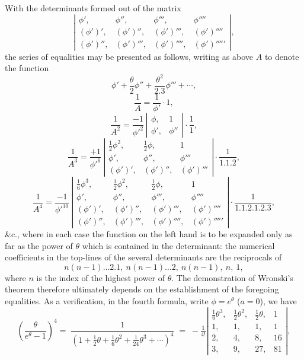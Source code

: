 \documentclass[11pt]{article}
\begin{document}
\bigskip

With the determinants formed out of the matrix
\[
\left|\begin{array}{cccc}\phi',&\phi'',&\phi''',&\phi''''\\ (\phi')',&(\phi')'',&(\phi')''',&(\phi')''''\\ (\phi')'',&(\phi')''',&(\phi')'''',&(\phi')'''''\end{array}\right|,
\]
the series of equalities may be presented as follows, writing as above $A$ to denote the function
\[
\phi' + \frac{\theta}{2}\phi'' + \frac{\theta^{2}}{2.3}\phi''' + \cdots,
\]
\[
\frac{1}{A} = \frac{1}{\phi'} \cdot 1,
\]
\[
\frac{1}{A^{2}} = \frac{-1}{\phi'^{2}}\,\left|\begin{array}{cc}\phi,&1\\ \phi',&\phi''\end{array}\right| \cdot \frac{1}{1},
\]
\[
\frac{1}{A^{3}} = \frac{+1}{\phi'^{6}}\,\left|\begin{array}{ccc}\tfrac{1}{2}\phi^{2},&\tfrac{1}{2}\phi,&1\\ \phi',&\phi'',&\phi'''\\ (\phi')',&(\phi')'',&(\phi')'''\end{array}\right| \cdot \frac{1}{1.1.2},
\]
\[
\frac{1}{A^{4}} = \frac{-1}{\phi'^{10}}\,\left|\begin{array}{cccc}\tfrac{1}{6}\phi^{3},&\tfrac{1}{2}\phi^{2},&\tfrac{1}{2}\phi,&1\\ \phi',&\phi'',&\phi''',&\phi''''\\ (\phi')',&(\phi')'',&(\phi')''',&(\phi')''''\\ (\phi')'',&(\phi')''',&(\phi')'''',&(\phi')'''''\end{array}\right| \cdot \frac{1}{1.1.2.1.2.3},
\]
\&c., where in each case the function on the left hand is to be expanded only as far as the power of $\theta$ which is contained in the determinant: the numerical coefficients in the top-lines of the several determinants are the reciprocals of
\[
n(n-1)\ldots 2.1,\ n(n-1)\ldots 2,\ n(n-1),\ n,\ 1,
\]
where $n$ is the index of the highest power of $\theta$. The demonstration of Wronski's theorem therefore ultimately depends on the establishment of the foregoing equalities. As a verification, in the fourth formula, write $\phi = e^{\theta}$ ($a=0$), we have
\[
\left(\frac{\theta}{e^{\theta}-1}\right)^{4} \!\!=\;
\frac{1}{(1+\tfrac{1}{2}\theta+\tfrac{1}{6}\theta^{2}+\tfrac{1}{24}\theta^{3}+\cdots)^{4}}
\;=\; -\tfrac{1}{4!}\!\left|\begin{array}{cccc}\tfrac{1}{6}\theta^{3},&\tfrac{1}{2}\theta^{2},&\tfrac{1}{2}\theta,&1\\ 1,&1,&1,&1\\ 2,&4,&8,&16\\ 3,&9,&27,&81\end{array}\right|,
\]
\end{document}
